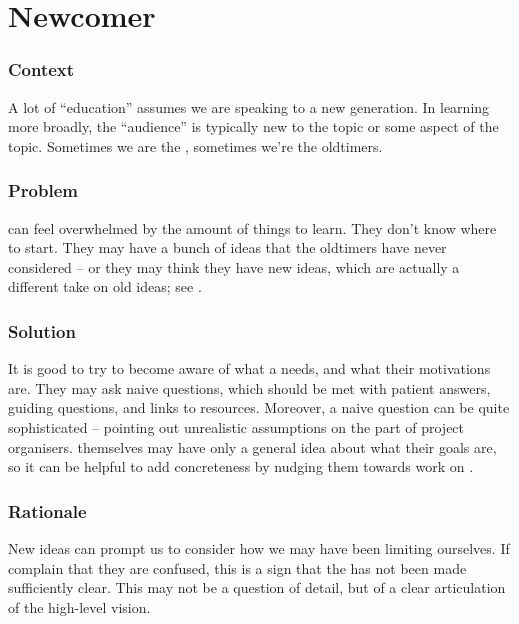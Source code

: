 \begingroup \color{BurntOrange}

\section{Newcomer}\label{sec:Newcomer}

\subsubsection*{Context}
A lot of ``education'' assumes we are speaking to a new generation. 
In learning more broadly, the ``audience'' is typically new to the topic or some aspect of the topic.
Sometimes we are the , sometimes we're the oldtimers.

\subsubsection*{Problem}  can feel overwhelmed by the amount of things to learn.  They
don't know where to start.  They may have a bunch of ideas that the
oldtimers have never considered -- or they may think they have new
ideas, which are actually a different take on old ideas; see
.

\subsubsection*{Solution} It is good to try to become aware of what a
 needs, and what their motivations are.  They may ask naive questions, which
should be met with patient answers, guiding questions, and links to resources.
Moreover, a naive question can be quite sophisticated -- pointing out unrealistic
assumptions on the part of project organisers.   themselves
may have only a general idea about what their goals are, so it can be helpful to add
concreteness by nudging them towards work on .

\subsubsection*{Rationale} 
New ideas can prompt us to consider how we may have been limiting ourselves.
If  complain that they are confused, this is a sign that
the  has not been made sufficiently clear.  This may not
be a question of detail, but of a clear articulation of the high-level vision.


